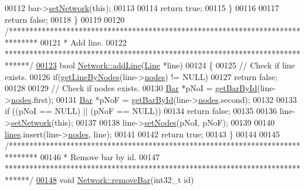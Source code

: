 \begin{DoxyCode}
00112     bar->\hyperlink{group___models_gade9a307fdb6a81871787899ec1af5833}{setNetwork}(\textcolor{keyword}{this});
00113 
00114     \textcolor{keywordflow}{return} \textcolor{keyword}{true};
00115   \}
00116 
00117   \textcolor{keywordflow}{return} \textcolor{keyword}{false};
00118 \}
00119 
00120 \textcolor{comment}{/*******************************************************************************}
00121 \textcolor{comment}{ * Add line.}
00122 \textcolor{comment}{ ******************************************************************************/}
\hypertarget{network_8cpp_source_l00123}{}\hyperlink{group___models_gae02945131494987b3ff9b59b627719b4}{00123} \textcolor{keywordtype}{bool} \hyperlink{group___models_gae02945131494987b3ff9b59b627719b4}{Network::addLine}(\hyperlink{class_line}{Line} *line)
00124 \{
00125   \textcolor{comment}{// Check if line exists.}
00126   \textcolor{keywordflow}{if}(\hyperlink{group___models_ga8f090b85a7779695cb9f05b6395b3044}{getLineByNodes}(line->\hyperlink{class_line_afd17c40d656e6a8d677cb22df5f0c70b}{nodes}) != NULL)
00127     \textcolor{keywordflow}{return} \textcolor{keyword}{false};
00128 
00129   \textcolor{comment}{// Check if nodes exists.}
00130   \hyperlink{class_bar}{Bar} *pNoI = \hyperlink{group___models_ga04d524ce0fa0dd0d06deda92b1597af0}{getBarById}(line->\hyperlink{class_line_afd17c40d656e6a8d677cb22df5f0c70b}{nodes}.first);
00131   \hyperlink{class_bar}{Bar} *pNoF = \hyperlink{group___models_ga04d524ce0fa0dd0d06deda92b1597af0}{getBarById}(line->\hyperlink{class_line_afd17c40d656e6a8d677cb22df5f0c70b}{nodes}.second);
00132 
00133   \textcolor{keywordflow}{if} ((pNoI == NULL) || (pNoF == NULL))
00134     \textcolor{keywordflow}{return} \textcolor{keyword}{false};
00135 
00136   line->\hyperlink{group___models_ga320766e09f0ea36b2dd07d3b1db1b72e}{setNetwork}(\textcolor{keyword}{this});
00137 
00138   line->\hyperlink{group___models_gaeeab146e6c1d7d1a688a2764a9c9a170}{setNodes}(pNoI, pNoF);
00139 
00140   \hyperlink{class_network_a49659f95d02baf087707c5a94fa23d90}{lines}.insert(line->\hyperlink{class_line_afd17c40d656e6a8d677cb22df5f0c70b}{nodes}, line);
00141 
00142   \textcolor{keywordflow}{return} \textcolor{keyword}{true};
00143 \}
00144 
00145 \textcolor{comment}{/*******************************************************************************}
00146 \textcolor{comment}{ * Remove bar by id.}
00147 \textcolor{comment}{ ******************************************************************************/}
\hypertarget{network_8cpp_source_l00148}{}\hyperlink{group___models_ga997ce4f03d316b9f138f2e64e6ca400c}{00148} \textcolor{keywordtype}{void} \hyperlink{group___models_ga997ce4f03d316b9f138f2e64e6ca400c}{Network::removeBar}(int32\_t \textcolor{keywordtype}{id})

\end{DoxyCode}
